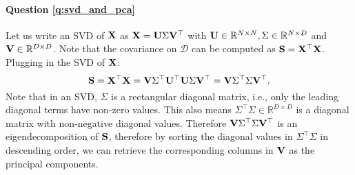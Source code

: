 \paragraph{Question \ref{q:svd_and_pca}}
Let us write an SVD of $\mathbf{X}$ as $\mathbf{X} = \mathbf U \Sigma \mathbf V^\top$ with $\mathbf U \in \mathbb{R}^{N \times N}, \Sigma \in \mathbb{R}^{N \times D}$ and $\mathbf V \in \mathbb{R}^{D \times D}$. Note that the covariance on $\mathcal{D}$ can be computed as $\mathbf{S} = \mathbf X^\top \mathbf X$. Plugging in the SVD of $\mathbf{X}$:
$$ \mathbf{S} = \mathbf X^\top \mathbf X = \mathbf V \Sigma^{\top} \mathbf U^\top \mathbf U \Sigma \mathbf V^\top = \mathbf V \Sigma^{\top} \Sigma \mathbf V^\top.$$
Note that in an SVD, $\Sigma$ is a rectangular diagonal matrix, i.e., only the leading diagonal terms have non-zero values. This also means $\Sigma^{\top} \Sigma \in \mathbb{R}^{D \times D}$ is a diagonal matrix with non-negative diagonal values. Therefore $\mathbf V \Sigma^{\top} \Sigma \mathbf V^\top$ is an eigendecomposition of $\mathbf{S}$, therefore by sorting the diagonal values in $\Sigma^{\top} \Sigma$ in descending order, we can retrieve the corresponding columns in $\mathbf V$ as the principal components.


